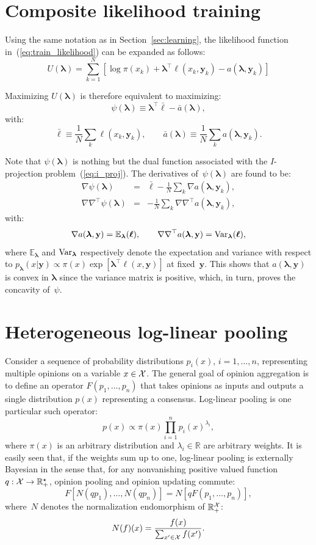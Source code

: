 \documentclass[english]{scrartcl}
\def\y{{\mathbf{y}}}
\newcommand{\blambda}{{\boldsymbol{\lambda}}}
\newcommand{\bell}{{\boldsymbol{\ell}}}
\newcommand{\E}{\mathbb{E}}
\begin{document}
\section{Composite likelihood training}
\label{app:training}

Using the same notation as in Section~\ref{sec:learning}, the likelihood function in~(\ref{eq:train_likelihood}) can be expanded as follows:
$$
U(\blambda) 
= \sum_{k=1}^N \left[
\log \pi(x_k) + \blambda^\top \bell(x_k, \y_k) - a(\blambda,\y_k)
\right]
$$

Maximizing $U(\blambda)$ is therefore equivalent to maximizing: 
$$
\psi(\blambda) \equiv \blambda^\top \bar{\bell} - \bar{a}(\blambda), 
$$
with:
$$
\bar{\bell} \equiv \frac{1}{N} \sum_k \bell(x_k,\y_k),
\qquad
\bar{a}(\blambda) \equiv \frac{1}{N} \sum_k a(\blambda,\y_k).
$$

Note that $\psi(\blambda)$ is nothing but the dual function associated with the $I$-projection problem~(\ref{eq:i_proj}). The derivatives of~$\psi(\blambda)$ are found to be:
\begin{eqnarray*}
\nabla\psi(\blambda)
 & = & \bar{\bell} - \frac{1}{N} \sum_k \nabla a(\blambda,\y_k), \\
\nabla\nabla^\top\psi(\blambda)
 & = & - \frac{1}{N} \sum_k \nabla \nabla^\top a(\blambda,\y_k),
\end{eqnarray*}
with:
$$
\nabla a(\blambda,\y) = \E_{\blambda}(\bell),
\qquad
\nabla \nabla^\top a(\blambda,\y) = {\rm Var}_{\blambda}(\bell),
$$
where $\E_{\blambda}$ and ${\rm Var}_{\blambda}$ respectively denote the expectation and variance with respect to $p_\blambda(x|\y)\propto \pi(x)\exp[\blambda^\top \bell(x,\y)]$ at fixed~$\y$. This shows that $a(\blambda,\y)$ is convex in $\blambda$ since the variance matrix is positive, which, in turn, proves the concavity of~$\psi$.



\section{Heterogeneous log-linear pooling}
\label{app:hetero}

Consider a sequence of probability distributions $p_i(x)$, $i=1,\ldots,n$, representing multiple opinions on a variable $x\in{\cal X}$. The general goal of opinion aggregation is to define an operator $F(p_1,\ldots,p_n)$ that takes opinions as inputs and outputs a single distribution $p(x)$ representing a consensus. Log-linear pooling \cite{Genest-86} is one particular such operator:
$$
p(x)\propto \pi(x) \prod_{i=1}^n p_i(x)^{\lambda_i},
$$
where $\pi(x)$ is an arbitrary distribution and $\lambda_i\in\mathbb{R}$ are arbitrary weights. It is easily seen that, if the weights sum up to one, log-linear pooling is externally Bayesian in the sense that, for any nonvanishing positive valued function $q:{\cal X}\to \mathbb{R}^\star_+$, opinion pooling and opinion updating commute:
$$
F[N(q p_1), \ldots, N(q p_n)]
=
N[q F(p_1,\ldots, p_n)],
$$
where~$N$ denotes the normalization endomorphism of $\mathbb{R}_+^{\cal X}$:
$$
N(f)(x) = \frac{f(x)}{\sum_{x'\in{\cal X}} f(x')}
.
$$
\end{document}
